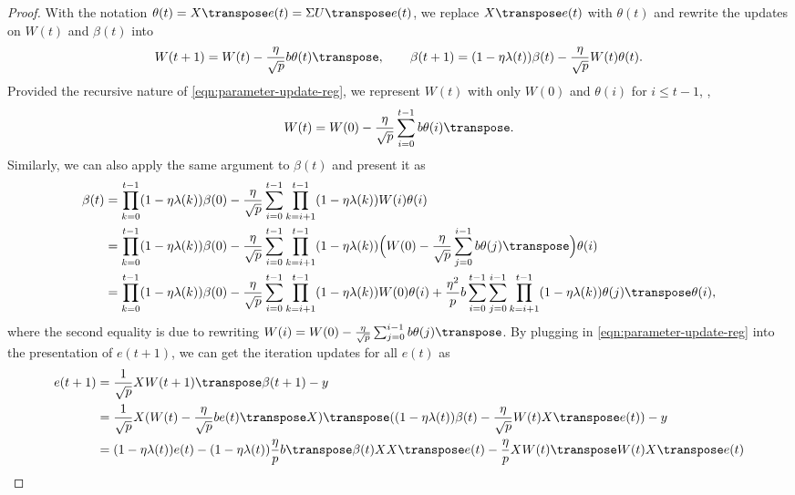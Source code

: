 \begin{proof}
    With the notation $\theta(t) = X\transpose e(t) = \Sigma U\transpose e(t)$, we replace $X\transpose e(t)$ with $\theta(t)$ and rewrite the updates on $W(t)$ and $\beta(t)$ into 
    \begin{align}\label{eqn:parameter-update-reg}
        W(t+1) = W(t) - \frac{\eta}{\sqrt p}b \theta(t)\transpose, \qquad \beta(t+1) = (1-\eta\lambda(t))\beta(t) - \frac{\eta}{\sqrt p} W(t)\theta(t). 
    \end{align}
    Provided the recursive nature of \cref{eqn:parameter-update-reg}, we represent $W(t)$ with only $W(0)$ and $\theta(i)$ for $i\leq t-1$, \ie,
    \begin{align}\label{eqn:Wt}
        W(t) = W(0) - \frac{\eta}{\sqrt p} \sum_{i=0}^{t-1} b\theta(i)\transpose.
   \end{align}
    Similarly, we can also apply the same argument to $\beta(t)$ and present it as
    \begin{align}\label{eqn:betat}
        \beta(t) &= \prod_{k=0}^{t-1}(1-\eta\lambda(k))\beta(0) - \frac{\eta}{\sqrt p}\sum_{i=0}^{t-1} \prod_{k=i+1}^{t-1}(1-\eta\lambda(k))W(i)\theta(i) \\
        & = \prod_{k=0}^{t-1}(1-\eta\lambda(k))\beta(0) - \frac{\eta}{\sqrt p}\sum_{i=0}^{t-1} \prod_{k=i+1}^{t-1}(1-\eta\lambda(k))\Big( W(0) - \frac{\eta}{\sqrt p} \sum_{j=0}^{i-1} b\theta(j)\transpose\Big) \theta(i) \\
        & = \prod_{k=0}^{t-1}(1-\eta\lambda(k))\beta(0) - \frac{\eta}{\sqrt p}\sum_{i=0}^{t-1} \prod_{k=i+1}^{t-1}(1-\eta\lambda(k))W(0)\theta(i) + \frac{\eta^2}{p}b\sum_{i=0}^{t-1}\sum_{j=0}^{i-1} \prod_{k=i+1}^{t-1}(1-\eta\lambda(k))\theta(j)\transpose\theta(i),
    \end{align}
    where the second equality is due to rewriting $W(i) = W(0) - \frac{\eta}{\sqrt p} \sum_{j=0}^{i-1} b\theta(j)\transpose$. By plugging in \cref{eqn:parameter-update-reg} into the presentation of $e(t+1)$, we can get the iteration updates for all $e(t)$ as 
    \begin{align}\label{eqn:error-iterate}
        \begin{split}
            e(t+1) 
            &=\frac{1}{\sqrt p}X W(t+1)\transpose \beta(t+1) - y \\
            &=\frac{1}{\sqrt p}X (W(t) - \frac{\eta}{\sqrt p}b e(t)\transpose X)\transpose((1-\eta\lambda(t))\beta(t)-\frac{\eta}{\sqrt p} W(t)X\transpose e(t)) - y \\ 
            &=(1-\eta\lambda(t))e(t) - (1-\eta\lambda(t)) \frac{\eta}{p}b\transpose\beta(t) XX\transpose e(t) - \frac{\eta}{p}XW(t)\transpose W(t)X\transpose e(t) \\

\end{split}
\end{align}
\end{proof}
